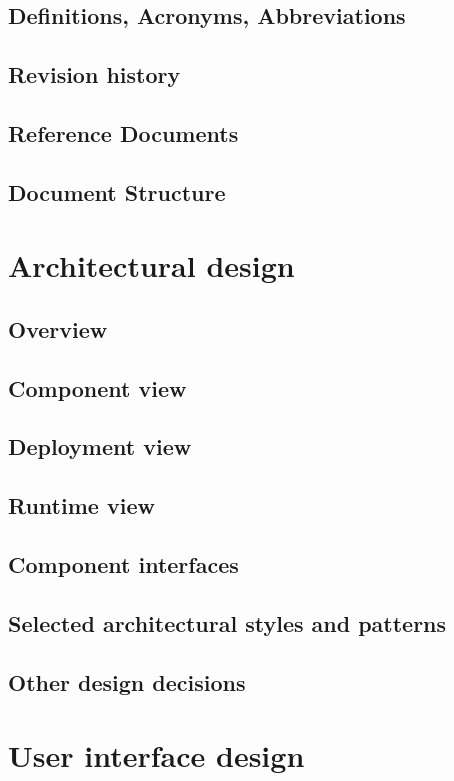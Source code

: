 \documentclass[a4paper]{article}
\begin{document}
\subsection{Definitions, Acronyms, Abbreviations}
\subsection{Revision history}
\subsection{Reference Documents}
\subsection{Document Structure}

\newpage
\section{Architectural design}

\subsection{Overview}
\subsection{Component view}
\subsection{Deployment view}
\subsection{Runtime view}
\subsection{Component interfaces}
\subsection{Selected architectural styles and patterns}
\subsection{Other design decisions}

\newpage
\section{User interface design}
\end{document}
